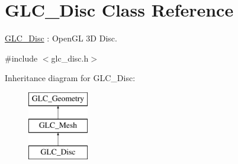 \hypertarget{class_g_l_c___disc}{\section{G\-L\-C\-\_\-\-Disc Class Reference}
\label{class_g_l_c___disc}
}


\hyperlink{class_g_l_c___disc}{G\-L\-C\-\_\-\-Disc} \-: Open\-G\-L 3\-D Disc.  




{\ttfamily \#include $<$glc\-\_\-disc.\-h$>$}

Inheritance diagram for G\-L\-C\-\_\-\-Disc\-:\begin{figure}[H]
\begin{center}
\leavevmode
\includegraphics[height=3.000000cm]{class_g_l_c___disc}
\end{center}
\end{figure}

